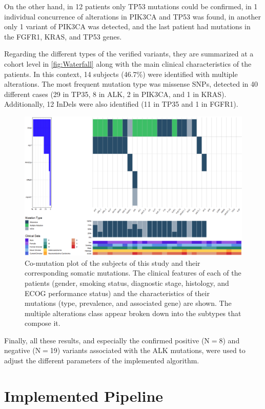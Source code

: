 On the other hand, in 12 patients only TP53 mutations could be confirmed, in 1 individual concurrence of alterations in PIK3CA and TP53 was found, in another only 1 variant of PIK3CA was detected, and the last patient had mutations in the FGFR1, KRAS, and TP53 genes.

Regarding the different types of the verified variants, they are summarized at a cohort level in \autoref{fig:Waterfall} along with the main clinical characteristics of the patients. In this context, 14 subjects (46.7\%) were identified with multiple alterations. The most frequent mutation type was missense SNPs, detected in 40 different cases (29 in TP35, 8 in ALK, 2 in PIK3CA, and 1 in KRAS). Additionally, 12 InDels were also identified (11 in TP35 and 1 in FGFR1).

\begin{figure}[ht]
    \centering
    \includegraphics[width=\textwidth]{Images/chapter_4/waterfall.png}
    \caption{Co-mutation plot of the subjects of this study and their corresponding somatic mutations. The clinical features of each of the patients (gender, smoking status, diagnostic stage, histology, and ECOG performance status) and the characteristics of their mutations (type, prevalence, and associated gene) are shown. The multiple alterations class appear broken down into the subtypes that compose it.}
    \label{fig:Waterfall}
\end{figure}

Finally, all these results, and especially the confirmed positive (N$=$8) and negative (N$=$19) variants associated with the ALK mutations, were used to adjust the different parameters of the implemented algorithm.

\section{Implemented Pipeline}

